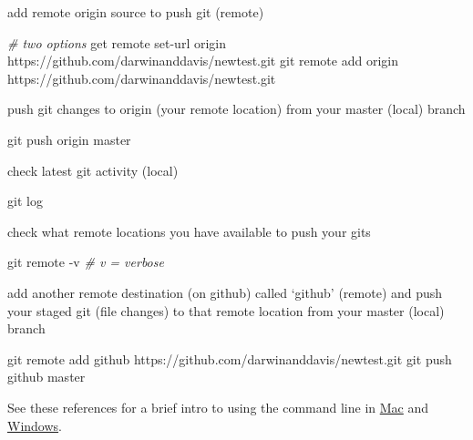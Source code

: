 \documentclass[10,portrait]{article}
\newenvironment{Shaded}{\begin{snugshade}}{\end{snugshade}}
\newcommand{\CommentTok}[1]{\textcolor[rgb]{0.56,0.35,0.01}{\textit{#1}}}
\newcommand{\FunctionTok}[1]{\textcolor[rgb]{0.00,0.00,0.00}{#1}}
\newcommand{\ExtensionTok}[1]{#1}
\newcommand{\NormalTok}[1]{#1}
\begin{document}
add remote origin source to push git (remote)

\begin{Shaded}
\begin{Highlighting}[]
\CommentTok{# two options  }
\ExtensionTok{get}\NormalTok{ remote set-url origin https://github.com/darwinanddavis/newtest.git  }
\FunctionTok{git}\NormalTok{ remote add origin https://github.com/darwinanddavis/newtest.git}
\end{Highlighting}
\end{Shaded}

push git changes to origin (your remote location) from your master
(local) branch

\begin{Shaded}
\begin{Highlighting}[]
\FunctionTok{git}\NormalTok{ push origin master }
\end{Highlighting}
\end{Shaded}

check latest git activity (local)

\begin{Shaded}
\begin{Highlighting}[]
\FunctionTok{git}\NormalTok{ log}
\end{Highlighting}
\end{Shaded}

check what remote locations you have available to push your gits

\begin{Shaded}
\begin{Highlighting}[]
\FunctionTok{git}\NormalTok{ remote -v }\CommentTok{# v = verbose    }
\end{Highlighting}
\end{Shaded}

add another remote destination (on github) called `github' (remote) and
push your staged git (file changes) to that remote location from your
master (local) branch

\begin{Shaded}
\begin{Highlighting}[]
\FunctionTok{git}\NormalTok{ remote add github https://github.com/darwinanddavis/newtest.git }
\FunctionTok{git}\NormalTok{ push github master }
\end{Highlighting}
\end{Shaded}

See these references for a brief intro to using the command line in
\href{https://macpaw.com/how-to/use-terminal-on-mac}{Mac} and
\href{https://www.computerhope.com/issues/chusedos.htm}{Windows}.
\end{document}
